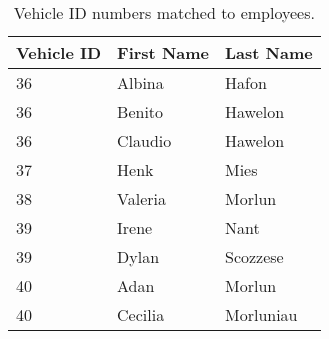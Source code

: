 \begin{table}[H]
\begin{center}
\begin{tabular}{|l|l|l|}
\hline
Vehicle ID & First Name & Last Name \\ \hline \hline

36 &Albina & Hafon\\ \hline
36&Benito& Hawelon\\ \hline
36&Claudio& Hawelon\\ \hline
37&Henk&Mies \\ \hline
38&Valeria&Morlun \\ \hline
39&Irene& Nant\\ \hline
39&Dylan& Scozzese\\ \hline
40&Adan& Morlun\\ \hline
40&Cecilia& Morluniau\\ \hline


\end{tabular}
\caption{\label{table:truck_drivers}Vehicle ID numbers matched to employees.}
\end{center}
\end{table}


	
	
	
	
